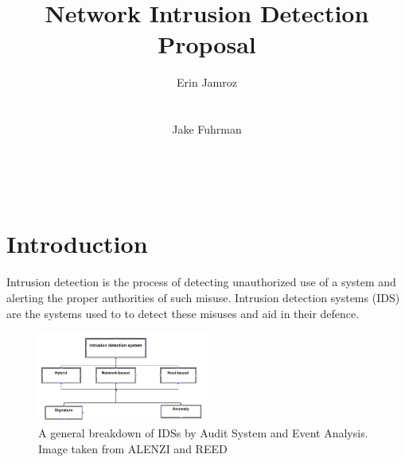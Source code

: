 \documentclass{acm_proc_article-sp}
\begin{document}
\title{Network Intrusion Detection Proposal}

\author{
\alignauthor
Erin Jamroz
       \\
       \\
       \\
\alignauthor
Jake Fuhrman
       \\
       \\
       \\
       \\       
}

\maketitle

\begin{abstract}

\end{abstract}

\section{Introduction}
	Intrusion detection is the process of detecting unauthorized use of a system and alerting the proper authorities of such misuse. Intrusion detection systems (IDS) are the systems used to to detect these misuses and aid in their defence. 
	\begin{figure}[h!]
		\centering
		\includegraphics[width=0.5\textwidth]{idsBreakdown.png}
		\caption{A general breakdown of IDSs by Audit System and Event Analysis. Image taken from ALENZI and REED \cite{Alenzi}} %
		\label{breakdown}
	\end{figure}

\end{document}
